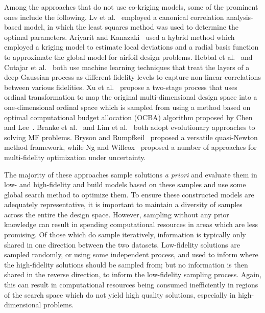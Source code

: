 Among the approaches that do not use co-kriging models, some of the prominent ones include the following. Lv et al.~\cite{lv2021multi} employed a canonical correlation analysis-based model, in which the least squares method was used to determine the optimal parameters. Ariyarit and Kanazaki~\cite{ariyarit2017multi} used a hybrid method which employed a kriging model to estimate local deviations and a radial basis function to approximate the global model for airfoil design problems. Hebbal et al.~\cite{hebbal2021multi} and Cutajar et al.~\cite{cutajar2019deep} both use machine learning techniques that treat the layers of a deep Gaussian process as different fidelity levels to capture non-linear correlations between various fidelities. Xu et al.~\cite{xu2016mo2tos} propose a two-stage process that uses ordinal transformation to map the original multi-dimensional design space into a one-dimensional ordinal space which is sampled from using a method based on optimal computational budget allocation (OCBA) algorithm proposed by Chen and Lee~\cite{chen2011stochastic}. Branke et al.~\cite{branke2016efficient} and Lim et al.~\cite{lim2008evolutionary} both adopt evolutionary approaches to solving MF problems. Bryson and Rumpfkeil~\cite{bryson2018multifidelity} proposed a versatile quasi-Newton method framework, while Ng and Willcox~\cite{ng2014multifidelity} proposed a number of approaches for multi-fidelity optimization under uncertainty.

The majority of these approaches sample solutions \emph{a priori} and evaluate them in low- and high-fidelity and build models based on these samples and use some global search method to optimize them. To ensure these constructed models are adequately representative, it is important to maintain a diversity of samples across the entire the design space. However, sampling without any prior knowledge can result in spending computational resources in areas which are less promising. Of those which do sample iteratively, information is typically only shared in one direction between the two datasets. Low-fidelity solutions are sampled randomly, or using some independent process, and used to inform where the high-fidelity solutions should be sampled from; but no information is then shared in the reverse direction, to inform the low-fidelity sampling process. Again, this can result in computational resources being consumed inefficiently in regions of the search space which do not yield high quality solutions, especially in high-dimensional problems. 

